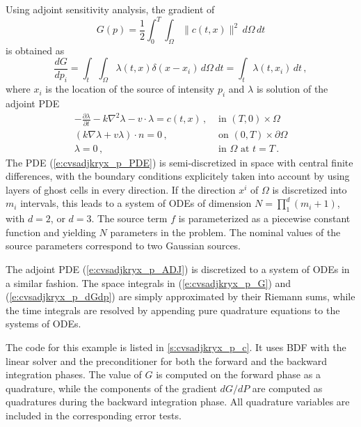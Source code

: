 Using adjoint sensitivity analysis, the gradient of
\begin{equation}\label{e:cvsadjkryx_p_G}
  G(p) = \frac{1}{2} \int_0^T \int_\Omega \| c(t,x) \|^2 \, d\Omega \, dt
\end{equation}
is obtained as
\begin{equation}\label{e:cvsadjkryx_p_dGdp}
  \frac{dG}{dp_i} = \int_t \int_\Omega \lambda(t,x) \delta(x-x_i) \, d\Omega \, dt
  = \int_t \lambda(t,x_i) \, dt \, ,
\end{equation}
where $x_i$ is the location of the source of intensity $p_i$ and $\lambda$
is solution of the adjoint PDE
\begin{equation}\label{e:cvsadjkryx_p_ADJ}
  \begin{split}
    - \frac{\partial\lambda}{\partial t} - k \nabla^2\lambda - v \cdot \lambda = c(t,x)  \, ,
    &\text{ in } (T,0) \times \Omega \\
    (k \nabla\lambda + v \lambda) \cdot n = 0 \, ,
    &\text{ on } (0,T) \times \partial\Omega \\
    \lambda = 0 \, ,
    &\text{ in } \Omega \text{ at } t = T \, .
  \end{split}
\end{equation}
The PDE (\ref{e:cvsadjkryx_p_PDE}) is semi-discretized in space with central finite differences,
with the boundary conditions explicitely taken into account by using layers of ghost cells 
in every direction. If the direction $x^i$ of $\Omega$ is discretized into $m_i$
intervals, this leads to a system of ODEs of dimension 
$N = \prod_1^d (m_i+1)$, with $d=2$, or $d=3$.
The source term $f$ is parameterized as a piecewise constant function and yielding
$N$ parameters in the problem. The nominal values of the source parameters correspond
to two Gaussian sources.

The adjoint PDE (\ref{e:cvsadjkryx_p_ADJ}) is discretized to a system of ODEs in a similar fashion.
The space integrals in (\ref{e:cvsadjkryx_p_G}) and (\ref{e:cvsadjkryx_p_dGdp}) are simply approximated
by their Riemann sums, while the time integrals are resolved by appending pure quadrature
equations to the systems of ODEs.

The code for this example is listed in \A\ref{s:cvsadjkryx_p_c}. It uses BDF with the {\cvspgmr}
linear solver and the {\cvbbdpre} preconditioner for both the forward and the backward
integration phases. The value of $G$ is computed on the forward phase as a quadrature,
while the components of the gradient $dG/dP$ are computed as quadratures during the
backward integration phase. All quadrature variables are included in the corresponding 
error tests.

